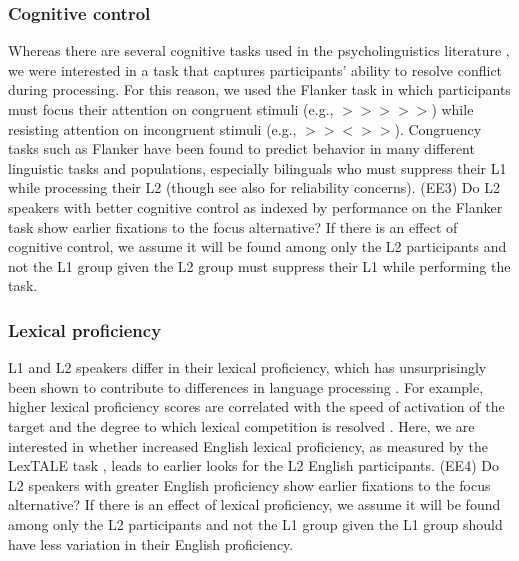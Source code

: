 \subsubsection{Cognitive control}
Whereas there are several cognitive tasks used in the psycholinguistics literature \parencite{ness2023state}, we were interested in a task that captures participants' ability to resolve conflict during processing. For this reason, we used the Flanker task \parencite{eriksen1974effects} in which 
participants must focus their attention on congruent stimuli (e.g., $>>>>>$) while resisting attention on incongruent stimuli (e.g., $>><>>$). Congruency tasks such as Flanker have been found to predict behavior in many different linguistic tasks and populations, especially bilinguals who must suppress their L1 while processing their L2 \parencite{blumenfeld2014cognitive,luk2011there} (though see also \cite{hedge2018reliability} for reliability concerns). (EE3) Do L2 speakers with better cognitive control as indexed by performance on the Flanker task show earlier fixations to the focus alternative? If there is an effect of cognitive control, we assume it will be found among only the L2 participants and not the L1 group given the L2 group must suppress their L1 while performing the task.



\subsubsection{Lexical proficiency}
L1 and L2 speakers differ in their lexical proficiency, which has unsurprisingly been shown to contribute to differences in language processing \parencite{Yap2012, zareva2005relationship}. For example, higher lexical proficiency scores are correlated with the speed of activation of the target and the degree to which lexical competition is resolved \parencite{sarrett2022within}. Here, we are interested in whether increased English lexical proficiency, as measured by the LexTALE task \parencite{lemhofer2012introducing}, leads to earlier looks for the L2 English participants. (EE4) Do L2 speakers with greater English proficiency show earlier fixations to the focus alternative? If there is an effect of lexical proficiency, we assume it will be found among only the L2 participants and not the L1 group given the L1 group should have less variation in their English proficiency.

 

